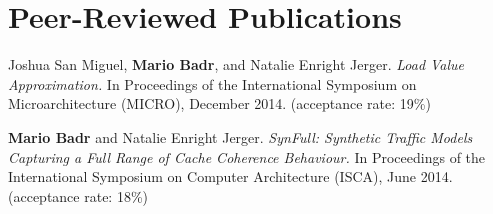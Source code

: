 \section{\sc Peer-Reviewed Publications}

\begin{samepage}
  Joshua San Miguel, \textbf{Mario Badr}, and Natalie Enright Jerger.
  \textit{Load Value Approximation.}
  In Proceedings of the International Symposium on Microarchitecture (MICRO), December 2014.
  (acceptance rate: 19\%)
\end{samepage}

\begin{samepage}
  \textbf{Mario Badr} and Natalie Enright Jerger.
  \textit{SynFull: Synthetic Traffic Models Capturing a Full Range of Cache Coherence Behaviour.}
  In Proceedings of the International Symposium on Computer Architecture (ISCA), June 2014.
  (acceptance rate: 18\%)
\end{samepage}
